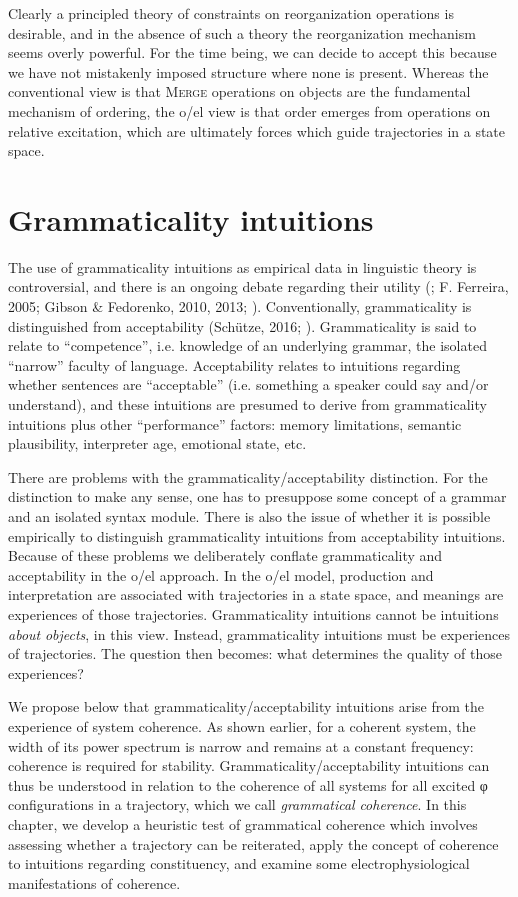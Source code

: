   Clearly a principled theory of constraints on reorganization operations is desirable, and in the absence of such a theory the reorganization mechanism seems overly powerful. For the time being, we can decide to accept this because we have not mistakenly imposed structure where none is present. Whereas the conventional view is that \textsc{Merge} operations on objects are the fundamental mechanism of ordering, the o/el view is that order emerges from operations on relative excitation, which are ultimately forces which guide trajectories in a state space.

\chapter{Grammaticality intuitions}

The use of grammaticality intuitions as empirical data in linguistic theory is controversial, and there is an ongoing debate regarding their utility (\citealt{CulicoverJackendoff2010}; F. Ferreira, 2005; Gibson \& Fedorenko, 2010, 2013; \citealt{SprouseAlmeida2013}). Conventionally, grammaticality is distinguished from acceptability (Schütze, 2016; \citealt{Sprouse2007}). Grammaticality is said to relate to “competence”, i.e. knowledge of an underlying grammar, the isolated “narrow” faculty of language. Acceptability relates to intuitions regarding whether sentences are “acceptable” (i.e. something a speaker could say and/or understand), and these intuitions are presumed to derive from grammaticality intuitions plus other “performance” factors: memory limitations, semantic plausibility, interpreter age, emotional state, etc. 

  There are problems with the grammaticality/acceptability distinction. For the distinction to make any sense, one has to presuppose some concept of a grammar and an isolated syntax module. There is also the issue of whether it is possible empirically to distinguish grammaticality intuitions from acceptability intuitions. Because of these problems we deliberately conflate grammaticality and acceptability in the o/el approach. In the o/el model, production and interpretation are associated with trajectories in a state space, and meanings are experiences of those trajectories. Grammaticality intuitions cannot be intuitions \textit{about} \textit{objects}, in this view. Instead, grammaticality intuitions must be experiences of trajectories. The question then becomes: what determines the quality of those experiences? 

  We propose below that grammaticality/acceptability intuitions arise from the experience of system coherence. As shown earlier, for a coherent system, the width of its power spectrum is narrow and remains at a constant frequency: coherence is required for stability. Grammaticality/acceptability intuitions can thus be understood in relation to the coherence of all systems for all excited φ configurations in a trajectory, which we call \textit{grammatical} \textit{coherence}. In this chapter, we develop a heuristic test of grammatical coherence which involves assessing whether a trajectory can be reiterated, apply the concept of coherence to intuitions regarding constituency, and examine some electrophysiological manifestations of coherence. 

